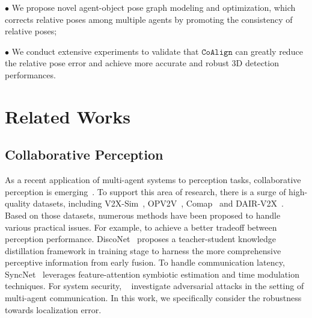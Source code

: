 \documentclass[letterpaper, 10 pt, conference]{ieeeconf}  %
\begin{document}
$\bullet$ We propose novel agent-object pose graph modeling and optimization, which corrects relative poses among multiple agents by promoting the consistency of relative poses;

$\bullet$ We conduct extensive experiments to validate that $\mathtt{CoAlign}$ can greatly reduce the relative pose error and achieve more accurate and robust 3D detection performances.



\section{Related Works}

\subsection{Collaborative Perception}
As a recent application of multi-agent systems to perception tasks, collaborative perception is emerging{~\cite{xu2022cobevt,xu2022v2xvit,chen2019f,DBLP:conf/eccv/WangMLYZU20}}. To support this area of research, there is a surge of high-quality datasets, including V2X-Sim~\cite{Li_2021_RAL}, OPV2V~\cite{xu2022opv2v}, Comap~\cite{comap} and DAIR-V2X~\cite{yu2022dairv2x}. Based on those datasets, numerous methods have been proposed to handle various practical issues. For example, to achieve a better tradeoff between perception performance. DiscoNet~\cite{Li_2021_NeurIPS} proposes a teacher-student knowledge distillation framework in training stage to harness the more comprehensive perceptive information from early fusion. To handle communication latency, SyncNet~\cite{lei2022latency} leverages feature-attention symbiotic estimation and time modulation techniques. For system security, ~\cite{tu2021adversarial} investigate adversarial attacks in the setting of multi-agent communication. In this work, we specifically consider the robustness towards localization error.

\end{document}
